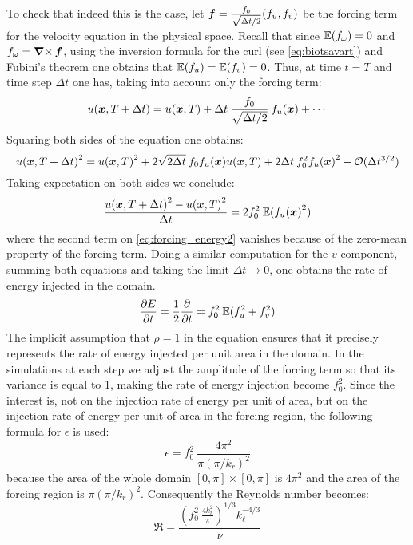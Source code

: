 \documentclass[../main.tex]{subfiles}
\begin{document}
To check that indeed this is the case, let $\boldsymbol{f}=\frac{f_0}{\sqrt{\Delta t/2}}(f_u,f_v)$ be the forcing term for the velocity equation in the physical space. Recall that since $\mathbb{E}(f_\omega)=0$ and $f_\omega = \operatorname{\boldsymbol{\nabla}\times} \boldsymbol{f}$, using the inversion formula for the curl (see \cref{eq:biotsavart}) and Fubini's theorem one obtains that $\mathbb{E}(f_u) = \mathbb{E}(f_v) = 0$. Thus, at time $t=T$ and time step $\Delta t$ one has, taking into account only the forcing term:
\begin{equation}
	u(\boldsymbol{x},T+\Delta t) = u(\boldsymbol{x},T) + \Delta t \:\frac{f_0}{\sqrt{\Delta t/2}}\: f_u(\boldsymbol{x}) + \cdots
\end{equation}
Squaring both sides of the equation one obtains:
\begin{equation}\label{eq:forcing_energy2}
	{u(\boldsymbol{x},T+\Delta t)}^2 = {u(\boldsymbol{x},T)}^2 + 2\sqrt{2\Delta t}\: f_0 f_u(\boldsymbol{x}) u(\boldsymbol{x},T) +2 \Delta t \: f_0^2 {f_u(\boldsymbol{x})}^2 + \mathcal{O}(\Delta t^{3/2})
\end{equation}
Taking expectation on both sides we conclude:
\begin{equation}
	\frac{{u(\boldsymbol{x},T+\Delta t)}^2 - {u(\boldsymbol{x},T)}^2}{\Delta t} = 2f_0^2\: \mathbb{E}({f_u(\boldsymbol{x})}^2)
\end{equation}
where the second term on \cref{eq:forcing_energy2} vanishes because of the zero-mean property of the forcing term. Doing a similar computation for the $v$ component, summing both equations and taking the limit $\Delta t \to 0$, one obtains the rate of energy injected in the domain.
\begin{equation}
	\pdv{E}{t}=\frac{1}{2}\pdv{}{t}(u^2 + v^2) = f_0^2\: \mathbb{E}(f_u^2 + f_v^2)
\end{equation}
The implicit assumption that $\rho=1$ in the equation ensures that it precisely represents the rate of energy injected per unit area in the domain. In the simulations at each step we adjust the amplitude of the forcing term so that its variance is equal to 1, making the rate of energy injection become $f_0^2$. Since the interest is, not on the injection rate of energy per unit of area, but on the injection rate of energy per unit of area in the forcing region, the following formula for $\epsilon$ is used:
\begin{equation}\label{eq:epsilon}
	\epsilon = f_0^2\: \frac{4 \pi^2}{\pi {(\pi / k_r)}^2}
\end{equation}
because the area of the whole domain $[0,\pi]\times[0,\pi]$ is $4\pi^2$ and the area of the forcing region is $\pi {(\pi / k_r)}^2$. Consequently the Reynolds number becomes:
\begin{equation}\label{eq:reynolds}
	\Re = \frac{{\left( f_0^2\:\frac{4 k_r^2}{\pi} \right)}^{1/3} k_\ell^{-4/3}}{\nu}
\end{equation}
\end{document}
